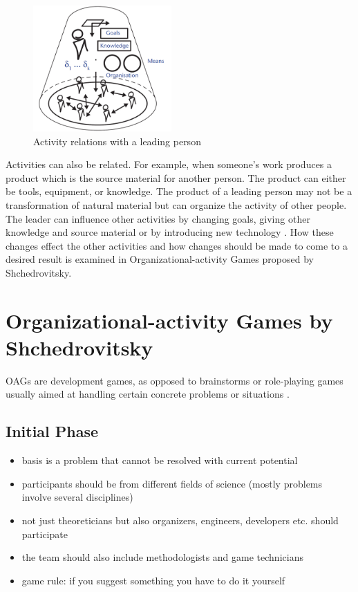 \documentclass[11pt]{article}
\begin{document}
\begin{figure}[h] 
  \centering
     \includegraphics[width=200px]{fig1.png}
  \caption{Activity relations with a leading person \cite[p. 38]{5}}
  \label{ARLP} 
\end{figure}

\noindent Activities can also be related. For example, when someone’s work produces a product which is the source material for another person. The product can either be tools, equipment, or knowledge.
The product of a leading person may not be a transformation of natural material but can organize the activity of other people. The leader can influence other activities by changing goals, giving other knowledge and source material or by introducing new technology \cite[p. 38]{5}. How these changes effect the other activities and how changes should be made to come to a desired result is examined in Organizational-activity Games proposed by Shchedrovitsky.


\section{Organizational-activity Games by Shchedrovitsky}
OAGs are development games, as opposed to brainstorms or role-playing games usually aimed at handling certain concrete problems or situations \cite{4}.  

\subsection{Initial Phase}
\begin{itemize}
	\setlength\itemsep{0em}
	\item	 basis is a problem that cannot be resolved with current potential 
	\item participants should be from different fields of science (mostly problems involve several disciplines)
	\item not just theoreticians but also organizers, engineers, developers etc. should \\ participate
	\item the team should also include methodologists and game technicians
	\item game rule: if you suggest something you have to do it yourself
\end{itemize}
\end{document}
